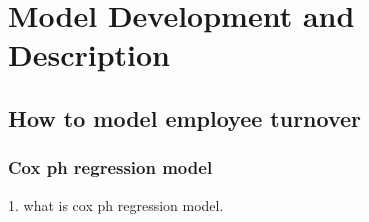 \documentclass[12pt,letterpaper]{article}
\begin{document}

\section{Model Development and Description} 
\subsection{How to model employee turnover}
\subsubsection{Cox ph regression model}
   1. what is cox ph regression model.
%   
\end{document}
